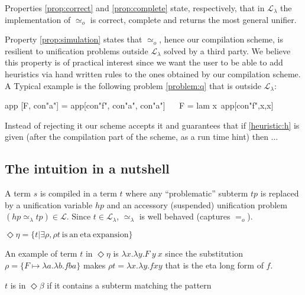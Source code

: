 \documentclass[sigconf,natbib=false]{acmart}
\newcommand{\EqualRel}{\ensuremath{=}}
\newcommand{\UnifRel}{\ensuremath{\simeq}}
\newcommand{\Uo}{\ensuremath{\UnifRel_o}\xspace}
\newcommand{\Eo}{\ensuremath{\EqualRel_o}\xspace}
\newcommand{\Ue}{\ensuremath{\UnifRel_\lambda}\xspace}
\newcommand{\llambda}{\ensuremath{\mathcal{L}_\lambda}\xspace}
\begin{document}
Properties \ref{prop:correct} and \ref{prop:complete} state, respectively, that
in \llambda the implementation of \Uo is correct, complete and returns the most
general unifier.

Property \ref{prop:simulation} states that \Uo, hence our compilation scheme,
is resilient to unification problems outside \llambda solved by
a third party. We believe this property is of practical interest since we
want the user to be able to add heuristics via hand written rules
to the ones obtained by our compilation scheme. A Typical example
is the following problem \ref{problem:q} that is outside \llambda:

\begin{elpicode}
app [F, con"a"] = app[con"f", con"a", con"a"]   ~~
F = lam x\ app[con"f",x,x]                      ~~
\end{elpicode}

\noindent
Instead of rejecting it our scheme accepts it and guarantees that if
\ref{heuristic:h} is given (after the compilation part of the scheme, as
a run time hint) then ...


\subsection{The intuition in a nutshell}
A term $s$ is compiled in a term $t$ where any
``problematic'' subterm $tp$ is replaced by a unification variable
$hp$ and an accessory
(suspended) unification problem $(hp \Ue tp) \in \mathcal{L}$.
Since $t \in \llambda$, \Ue is well behaved (captures \Eo).

\newcommand{\maybeeta}{\ensuremath{\Diamond\eta}\xspace}
\newcommand{\maybebeta}{\ensuremath{\Diamond\beta}\xspace}
\begin{definition}[\maybeeta]
  $\maybeeta = \{ t | \exists \rho, \rho t ~\mathrm{is~an~eta~expansion} \}$
\end{definition}

\noindent
An example of term $t$ in \maybeeta{} is
$\lambda x.\lambda y.F~y~x$
since the substitution
$\rho = \{ F \mapsto \lambda a.\lambda b.fba\}$
makes $\rho t = \lambda x.\lambda y.f x y$
that is the eta long form of $f$.

\begin{definition}[\maybebeta]
  $t$ is in \maybebeta if it contains a subterm matching the
  pattern 
\end{definition}
\end{document}
